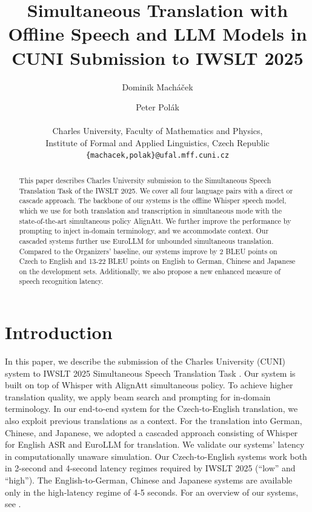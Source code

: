 \documentclass[11pt]{article}
\title{Simultaneous Translation with Offline Speech and LLM Models in CUNI Submission to IWSLT 2025}
\author{Dominik Macháček \and Peter Pol{\' a}k 
  \\ \\
Charles University, Faculty of Mathematics and Physics, \\ 
Institute of Formal and Applied Linguistics, Czech Republic \\
\texttt{\{machacek,polak\}}\texttt{@ufal.mff.cuni.cz} 
}
\date{}
\begin{document}
\maketitle
\begin{abstract}

This paper describes Charles University submission to the Simultaneous Speech Translation Task of the IWSLT 2025. We cover all four language pairs with a direct or cascade approach. The backbone of our systems is the offline Whisper speech model, which we use for both translation and transcription in simultaneous mode with the state-of-the-art simultaneous policy AlignAtt. We further improve the performance by prompting to inject in-domain terminology,  and we accommodate context. Our cascaded systems further use EuroLLM for unbounded simultaneous translation. Compared to the Organizers' baseline, our systems improve by 2 BLEU points on Czech to English and 13-22 BLEU points on English to German, Chinese and Japanese on the development sets. Additionally, we also propose a new enhanced measure of speech recognition latency.

\end{abstract}

\def\SimulStreaming{SimulStreaming}

\section{Introduction}


In this paper, we describe the submission of the Charles University (CUNI) system to IWSLT 2025 Simultaneous Speech Translation Task \cite{abdulmumin-etal-2025-findings}. 
Our system is built on top of Whisper \cite{Whisper-paper} with AlignAtt \cite{papi23_interspeech} simultaneous policy. To achieve higher translation quality, we apply beam search and prompting for in-domain terminology. In our end-to-end system for the Czech-to-English translation, we also exploit previous translations as a context. For the translation into German, Chinese, and Japanese, we adopted a cascaded approach consisting of Whisper for English ASR and EuroLLM \cite{eurollm} for translation. We validate our systems' latency in computationally unaware simulation. Our Czech-to-English systems work both in 2-second and 4-second latency regimes required by IWSLT 2025 (``low'' and ``high''). The English-to-German, Chinese and Japanese systems are available only in the high-latency regime of 4-5 seconds. For an overview of our systems, see .
\end{document}
